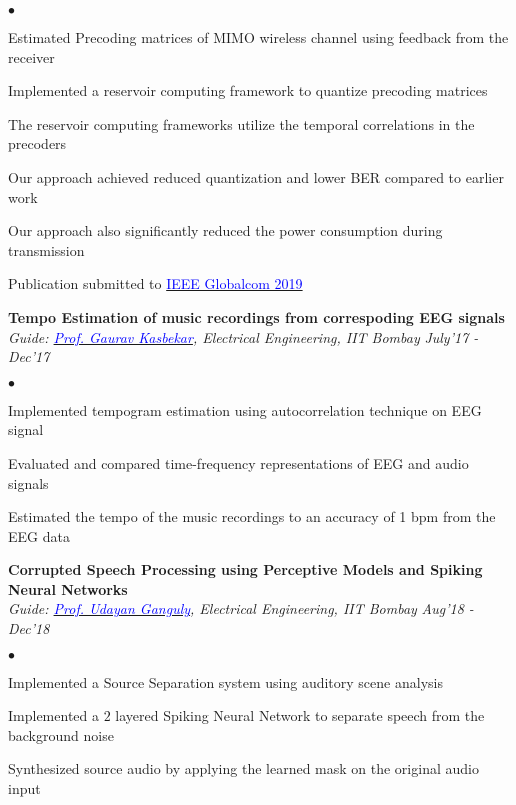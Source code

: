 \documentclass[margin,line, 9pt]{res}
\newenvironment{list2}{
  \begin{list}{$\bullet$}{%
      \setlength{\itemsep}{0.03in}
      \setlength{\parsep}{0in} \setlength{\parskip}{0in}
      \setlength{\topsep}{0in} \setlength{\partopsep}{0in} 
      \setlength{\leftmargin}{0.2in}}}{\end{list}}
\begin{document}
\begin{resume}
\vspace*{-.13in}
\begin{list2}
\item Estimated Precoding matrices of MIMO wireless channel using feedback from the receiver
\item Implemented a reservoir computing framework to quantize precoding matrices
\item The reservoir computing frameworks utilize the temporal correlations in the precoders
\item Our approach achieved reduced quantization and lower BER compared to earlier work
\item Our approach also significantly reduced the power consumption during transmission
\item Publication submitted to \href{https://globecom2019.ieee-globecom.org}{\textcolor{blue} {IEEE Globalcom 2019}}
\end{list2}
% 
% 
% 
% 
% 
{\bf Tempo Estimation of music recordings from correspoding EEG signals} \\
{\em Guide: \href{https://www.ee.iitb.ac.in/~gskasbekar/}{\textcolor{blue}{Prof. Gaurav Kasbekar}}, Electrical Engineering, IIT Bombay} \hfill {\it July'17 - Dec'17}\\
\vspace*{-.13in}
\begin{list2}
\item Implemented tempogram estimation using autocorrelation technique on EEG signal
\item Evaluated and compared time-frequency representations of EEG and audio signals 
\item Estimated the tempo of the music recordings to an accuracy of 1 bpm from the EEG data
\end{list2}
% 
{\bf Corrupted Speech Processing using Perceptive Models and Spiking Neural Networks} \\
{\em Guide: \href{https://www.ee.iitb.ac.in/wiki/faculty/udayan}{\textcolor{blue}{Prof. Udayan Ganguly}}, Electrical Engineering, IIT Bombay} \hfill {\it Aug'18 - Dec'18}\\
\vspace*{-.13in}
\begin{list2}
\item Implemented a Source Separation system using auditory scene analysis
\item Implemented a $2$ layered Spiking Neural Network to separate speech from the background noise
\item Synthesized source audio by applying the learned mask on the original audio input

\end{list2}
\end{resume}
\end{document}
